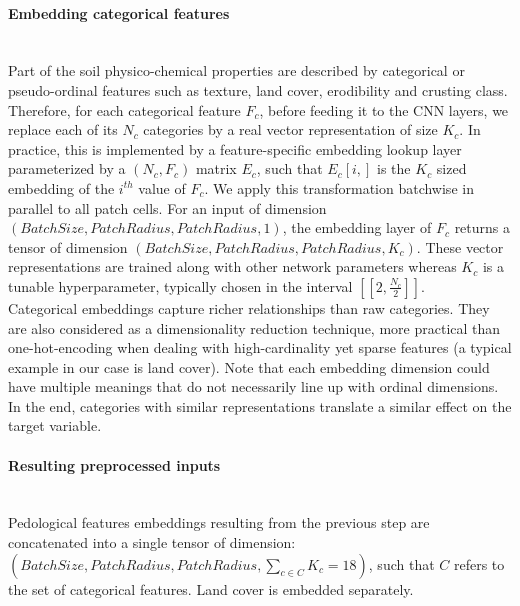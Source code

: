 \documentclass[]{article}
\begin{document}

\paragraph{Embedding categorical features}\mbox{}\\
Part of the soil physico-chemical properties are described by categorical or pseudo-ordinal features such as texture, land cover, erodibility and crusting class. Therefore, for each categorical feature $F_c$, before feeding it to the CNN layers, we replace each of its $N_c$ categories by a real vector representation of size $K_c$. In practice, this is implemented by a feature-specific embedding lookup layer parameterized by a $(N_c,F_c)$ matrix $E_c$, such that $E_c[i,]$ is the $K_c$ sized embedding of the $i^{th}$ value of $F_c$. We apply this transformation batchwise in parallel to all patch cells. For an input of dimension $(BatchSize, PatchRadius, PatchRadius, 1)$, the embedding layer of $F_c$ returns a tensor of dimension $(BatchSize, PatchRadius, PatchRadius, K_c)$. These vector representations are trained along with other network parameters whereas $K_c$ is a tunable hyperparameter, typically chosen in the interval $[\![2,\frac{N_c}{2}]\!]$. \\

\noindent Categorical embeddings capture richer relationships than raw categories. They are also considered as a dimensionality reduction technique, more practical than one-hot-encoding when dealing with high-cardinality yet sparse features (a typical example in our case is land cover). Note that each embedding dimension could have multiple meanings that do not necessarily line up with ordinal dimensions. In the end, categories with similar representations translate a similar effect on the target variable.\\

\paragraph{Resulting preprocessed inputs}\mbox{}\\
\noindent Pedological features embeddings resulting from the previous step are concatenated into a single tensor of dimension:\\ $(BatchSize, PatchRadius, PatchRadius,\sum_{c \in C}{K_c}=18)$, such that $C$ refers to the set of categorical features. Land cover is embedded separately.\\
\end{document}
